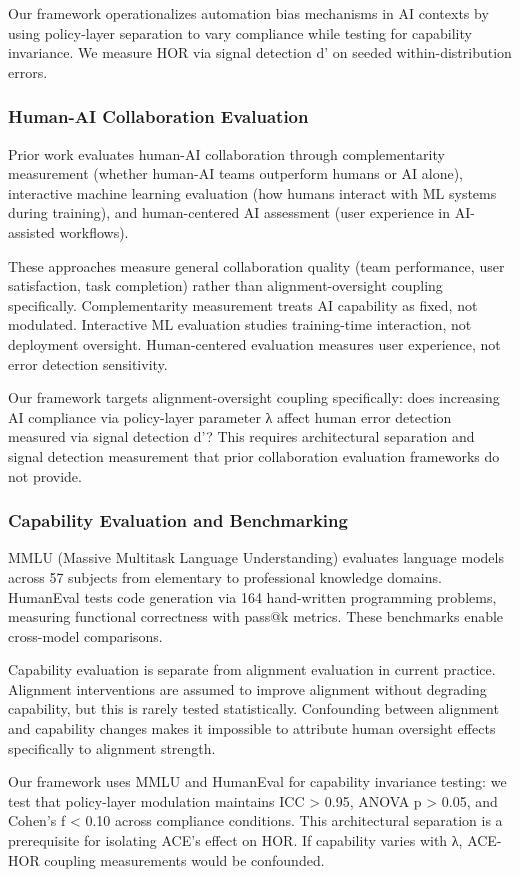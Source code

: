 Our framework operationalizes automation bias mechanisms in AI contexts by using policy-layer separation to vary compliance while testing for capability invariance. We measure HOR via signal detection d' on seeded within-distribution errors.

\subsubsection{Human-AI Collaboration Evaluation}

Prior work evaluates human-AI collaboration through complementarity measurement (whether human-AI teams outperform humans or AI alone), interactive machine learning evaluation (how humans interact with ML systems during training), and human-centered AI assessment (user experience in AI-assisted workflows).

These approaches measure general collaboration quality (team performance, user satisfaction, task completion) rather than alignment-oversight coupling specifically. Complementarity measurement treats AI capability as fixed, not modulated. Interactive ML evaluation studies training-time interaction, not deployment oversight. Human-centered evaluation measures user experience, not error detection sensitivity.

Our framework targets alignment-oversight coupling specifically: does increasing AI compliance via policy-layer parameter λ affect human error detection measured via signal detection d'? This requires architectural separation and signal detection measurement that prior collaboration evaluation frameworks do not provide.

\subsubsection{Capability Evaluation and Benchmarking}

MMLU (Massive Multitask Language Understanding) evaluates language models across 57 subjects from elementary to professional knowledge domains. HumanEval tests code generation via 164 hand-written programming problems, measuring functional correctness with pass@k metrics. These benchmarks enable cross-model comparisons.

Capability evaluation is separate from alignment evaluation in current practice. Alignment interventions are assumed to improve alignment without degrading capability, but this is rarely tested statistically. Confounding between alignment and capability changes makes it impossible to attribute human oversight effects specifically to alignment strength.

Our framework uses MMLU and HumanEval for capability invariance testing: we test that policy-layer modulation maintains ICC > 0.95, ANOVA p > 0.05, and Cohen's f < 0.10 across compliance conditions. This architectural separation is a prerequisite for isolating ACE's effect on HOR. If capability varies with λ, ACE-HOR coupling measurements would be confounded.
